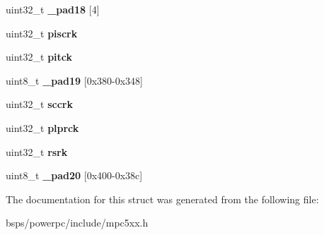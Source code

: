 \begin{DoxyCompactItemize}
uint32\+\_\+t {\bfseries \+\_\+pad18} \mbox{[}4\mbox{]}
\item 
\mbox{\label{structusiu___aa70cf5835335509fc29be2f8b905720f}} 
uint32\+\_\+t {\bfseries piscrk}
\item 
\mbox{\label{structusiu___ac5177ec13f22d36837c9ac23880bbbcb}} 
uint32\+\_\+t {\bfseries pitck}
\item 
\mbox{\label{structusiu___a2ab63d45f1a700f7c083ae22f3e371bd}} 
uint8\+\_\+t {\bfseries \+\_\+pad19} \mbox{[}0x380-\/0x348\mbox{]}
\item 
\mbox{\label{structusiu___a8f06a64bb75c0834873bbe90bbf1af8c}} 
uint32\+\_\+t {\bfseries sccrk}
\item 
\mbox{\label{structusiu___a43df26d7e00ba2601baa8a1228430cf2}} 
uint32\+\_\+t {\bfseries plprck}
\item 
\mbox{\label{structusiu___ab675001c69b80192ba4e78c5f7c7d273}} 
uint32\+\_\+t {\bfseries rsrk}
\item 
\mbox{\label{structusiu___a710387fa8e317739e12831be9e413a33}} 
uint8\+\_\+t {\bfseries \+\_\+pad20} \mbox{[}0x400-\/0x38c\mbox{]}
\end{DoxyCompactItemize}


The documentation for this struct was generated from the following file\+:\begin{DoxyCompactItemize}
\item 
bsps/powerpc/include/mpc5xx.\+h\end{DoxyCompactItemize}
